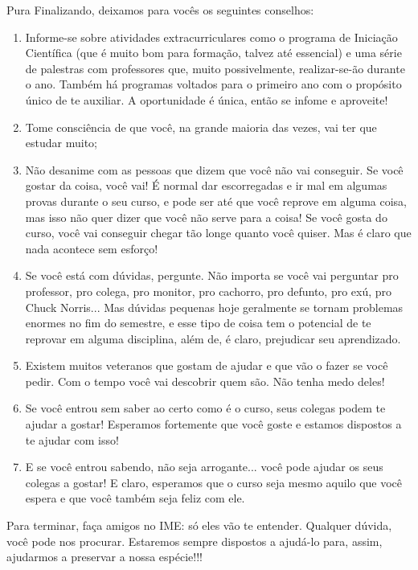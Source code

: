 \begin{subsecao}{Pura}
Finalizando, deixamos para vocês os seguintes conselhos:
\begin{enumerate}

\item Informe-se sobre atividades extracurriculares como o programa de
Iniciação Científica (que é muito bom para formação, talvez até essencial) e
uma série de palestras com professores que, muito possivelmente, realizar-se-ão
durante o ano. Também há programas voltados para o primeiro ano com o propósito único de te auxiliar. A oportunidade é única, então se infome e aproveite!
\item Tome consciência de que você, na grande maioria das vezes, vai ter que
estudar muito;
\item Não desanime com as pessoas que dizem que você não vai conseguir. Se você gostar da coisa, você vai! É normal dar escorregadas e ir mal em algumas provas durante o seu curso, e pode ser até que você reprove em alguma coisa, mas isso não quer dizer que você não serve para a coisa! Se você gosta do curso, você vai conseguir chegar tão longe quanto você quiser. Mas é claro que nada acontece sem esforço!
\item Se você está com dúvidas, pergunte. Não importa se você vai perguntar pro professor, pro colega, pro monitor, pro cachorro, pro defunto, pro exú, pro Chuck Norris... Mas dúvidas pequenas hoje geralmente se tornam problemas enormes no fim do semestre, e esse tipo de coisa tem o potencial de te reprovar em alguma disciplina, além de, é claro, prejudicar seu aprendizado.
\item Existem muitos veteranos que gostam de ajudar e que vão o fazer se você pedir. Com o tempo você vai descobrir quem são. Não tenha medo deles!
\item Se você entrou sem saber ao certo como é o curso, seus colegas podem te ajudar a gostar! Esperamos fortemente que você goste e estamos dispostos a te ajudar com isso!
\item E se você entrou sabendo, não seja arrogante... você pode ajudar os seus colegas a gostar! E claro, esperamos que o curso seja mesmo aquilo que você espera e que você também seja feliz com ele.

\end{enumerate}
Para terminar, faça amigos no IME: só eles vão te entender. Qualquer dúvida,
você pode nos procurar. Estaremos sempre dispostos a ajudá-lo para, assim, ajudarmos a
preservar a nossa espécie!!!

\end{subsecao}
